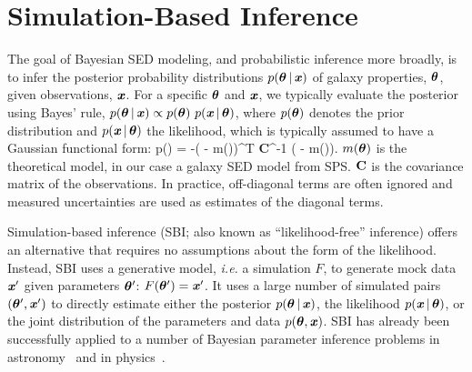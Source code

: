 \section{Simulation-Based Inference} \label{sec:sbi}
The goal of Bayesian SED modeling, and probabilistic inference more
broadly, is to infer the posterior probability distributions
$p(\boldsymbol{\theta}\,|\,\textbf{\textit{x}})$ of galaxy properties, $\boldsymbol{\theta}$, given observations, 
$\textbf{\textit{x}}$.
For a specific $\boldsymbol{\theta}$ and $\textbf{\textit{x}}$, we typically evaluate the posterior
using Bayes' rule, 
$p(\boldsymbol{\theta}\,|\,\textbf{\textit{x}}) \propto p(\boldsymbol{\theta})~p(\textbf{\textit{x}}\,|\,\boldsymbol{\theta})$, where 
$p(\boldsymbol{\theta})$ denotes the prior distribution and $p(\textbf{\textit{x}}\,|\,\boldsymbol{\theta})$ the
likelihood, which is typically assumed to have a Gaussian functional form: 
\beq
\label{eq:likelihood}
    \ln p(\given\btheta) = -\left( - m(\btheta)\right)^T {\bf C}^{-1}
    \left( - m(\btheta)\right).
\eeq
$m(\boldsymbol{\theta})$ is the theoretical model, in our case a galaxy SED model from SPS.
${\bf C}$ is the covariance matrix of the observations. 
In practice, off-diagonal terms are often ignored and measured uncertainties
are used as estimates of the diagonal terms. 

Simulation-based inference (SBI; also known as ``likelihood-free'' inference)
offers an alternative that requires no assumptions about the form of the
likelihood. 
Instead, SBI uses a generative model, \emph{i.e.} a simulation $F$, to generate
mock data $\textbf{\textit{x}}'$ given parameters $\boldsymbol{\theta}'$: $F(\boldsymbol{\theta}') = \textbf{\textit{x}}'$. 
It uses a large number of simulated pairs $(\boldsymbol{\theta}', \textbf{\textit{x}}')$ to directly estimate
either the posterior  $p(\boldsymbol{\theta}\,|\, \textbf{\textit{x}})$, the likelihood
$p(\textbf{\textit{x}}\,|\, \boldsymbol{\theta})$, or the joint distribution of the parameters and data $p(\boldsymbol{\theta}, \textbf{\textit{x}})$. 
SBI has already been successfully applied to a number of Bayesian parameter
inference problems in astronomy~\citep[\emph{e.g.}][]{cameron2012, weyant2013,
hahn2017b, kacprzak2018, alsing2018, wong2020, huppenkothen2021, zhang2021}
and in physics~\citep[\emph{e.g.}][]{brehmer2019, cranmer2020}.



